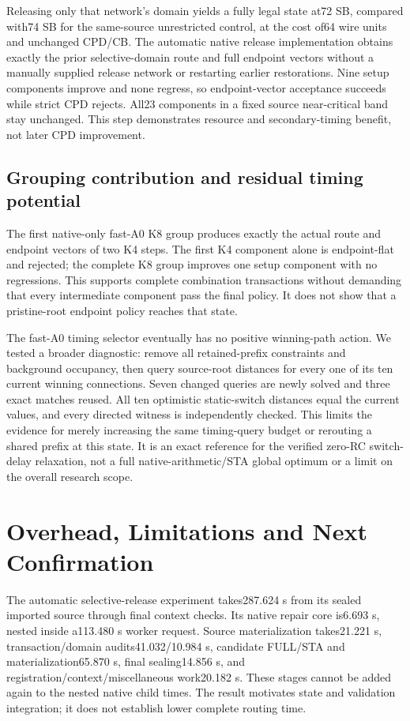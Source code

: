 \documentclass[conference,10pt]{IEEEtran}
\begin{document}
Releasing only that network's domain yields a fully legal state at72 SB, compared with74 SB for the same-source unrestricted control, at the cost of64 wire units and unchanged CPD/CB. The automatic native release implementation obtains exactly the prior selective-domain route and full endpoint vectors without a manually supplied release network or restarting earlier restorations. Nine setup components improve and none regress, so endpoint-vector acceptance succeeds while strict CPD rejects. All23 components in a fixed source near-critical band stay unchanged. This step demonstrates resource and secondary-timing benefit, not later CPD improvement.

\subsection{Grouping contribution and residual timing potential}
The first native-only fast-A0 K8 group produces exactly the actual route and endpoint vectors of two K4 steps. The first K4 component alone is endpoint-flat and rejected; the complete K8 group improves one setup component with no regressions. This supports complete combination transactions without demanding that every intermediate component pass the final policy. It does not show that a pristine-root endpoint policy reaches that state.

The fast-A0 timing selector eventually has no positive winning-path action. We tested a broader diagnostic: remove all retained-prefix constraints and background occupancy, then query source-root distances for every one of its ten current winning connections. Seven changed queries are newly solved and three exact matches reused. All ten optimistic static-switch distances equal the current values, and every directed witness is independently checked. This limits the evidence for merely increasing the same timing-query budget or rerouting a shared prefix at this state. It is an exact reference for the verified zero-RC switch-delay relaxation, not a full native-arithmetic/STA global optimum or a limit on the overall research scope.

\section{Overhead, Limitations and Next Confirmation}
The automatic selective-release experiment takes287.624 s from its sealed imported source through final context checks. Its native repair core is6.693 s, nested inside a113.480 s worker request. Source materialization takes21.221 s, transaction/domain audits41.032/10.984 s, candidate FULL/STA and materialization65.870 s, final sealing14.856 s, and registration/context/miscellaneous work20.182 s. These stages cannot be added again to the nested native child times. The result motivates state and validation integration; it does not establish lower complete routing time.
\end{document}
